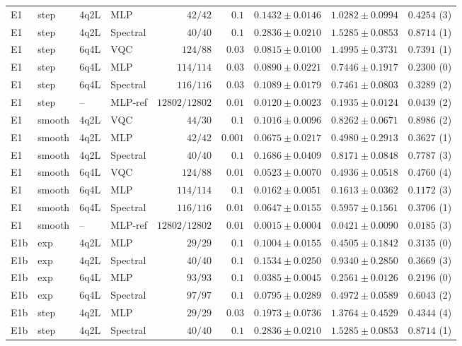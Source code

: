 \documentclass[11pt]{article}
\begin{document}
\begin{longtable}{llllrrrrr}
E1 & step & 4q2L & MLP & $42/42$ & $0.1$ & $0.1432\pm0.0146$ & $1.0282\pm0.0994$ & $0.4254$ (3) \\
E1 & step & 4q2L & Spectral & $40/40$ & $0.1$ & $0.2836\pm0.0210$ & $1.5285\pm0.0853$ & $0.8714$ (1) \\
E1 & step & 6q4L & VQC & $124/88$ & $0.03$ & $0.0815\pm0.0100$ & $1.4995\pm0.3731$ & $0.7391$ (1) \\
E1 & step & 6q4L & MLP & $114/114$ & $0.03$ & $0.0890\pm0.0221$ & $0.7446\pm0.1917$ & $0.2300$ (0) \\
E1 & step & 6q4L & Spectral & $116/116$ & $0.03$ & $0.1089\pm0.0179$ & $0.7461\pm0.0803$ & $0.3289$ (2) \\
E1 & step & -- & MLP-ref & $12802/12802$ & $0.01$ & $0.0120\pm0.0023$ & $0.1935\pm0.0124$ & $0.0439$ (2) \\
E1 & smooth & 4q2L & VQC & $44/30$ & $0.1$ & $0.1016\pm0.0096$ & $0.8262\pm0.0671$ & $0.8986$ (2) \\
E1 & smooth & 4q2L & MLP & $42/42$ & $0.001$ & $0.0675\pm0.0217$ & $0.4980\pm0.2913$ & $0.3627$ (1) \\
E1 & smooth & 4q2L & Spectral & $40/40$ & $0.1$ & $0.1686\pm0.0409$ & $0.8171\pm0.0848$ & $0.7787$ (3) \\
E1 & smooth & 6q4L & VQC & $124/88$ & $0.01$ & $0.0523\pm0.0070$ & $0.4936\pm0.0518$ & $0.4760$ (4) \\
E1 & smooth & 6q4L & MLP & $114/114$ & $0.1$ & $0.0162\pm0.0051$ & $0.1613\pm0.0362$ & $0.1172$ (3) \\
E1 & smooth & 6q4L & Spectral & $116/116$ & $0.01$ & $0.0647\pm0.0155$ & $0.5957\pm0.1561$ & $0.3706$ (1) \\
E1 & smooth & -- & MLP-ref & $12802/12802$ & $0.01$ & $0.0015\pm0.0004$ & $0.0421\pm0.0090$ & $0.0185$ (3) \\
\midrule
E1b & exp & 4q2L & MLP & $29/29$ & $0.1$ & $0.1004\pm0.0155$ & $0.4505\pm0.1842$ & $0.3135$ (0) \\
E1b & exp & 4q2L & Spectral & $40/40$ & $0.1$ & $0.1534\pm0.0250$ & $0.9340\pm0.2850$ & $0.3669$ (3) \\
E1b & exp & 6q4L & MLP & $93/93$ & $0.1$ & $0.0385\pm0.0045$ & $0.2561\pm0.0126$ & $0.2196$ (0) \\
E1b & exp & 6q4L & Spectral & $97/97$ & $0.1$ & $0.0795\pm0.0289$ & $0.4972\pm0.0589$ & $0.6043$ (2) \\
E1b & step & 4q2L & MLP & $29/29$ & $0.03$ & $0.1973\pm0.0736$ & $1.3764\pm0.4529$ & $0.4344$ (4) \\
E1b & step & 4q2L & Spectral & $40/40$ & $0.1$ & $0.2836\pm0.0210$ & $1.5285\pm0.0853$ & $0.8714$ (1) \\

\end{longtable}
\end{document}
